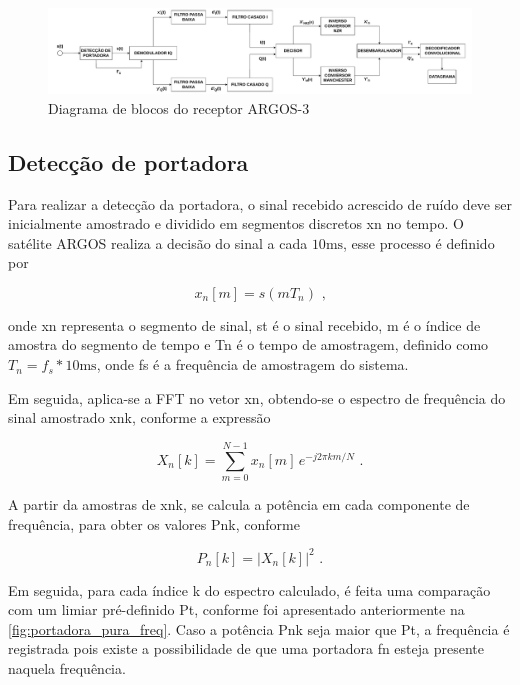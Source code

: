 \begin{figure}[H]
	\centering
	\caption{Diagrama de blocos do receptor ARGOS-3}\label{fig:diagrama_blocos_demodulador}
	\includegraphics[width=\linewidth]{assets/blocos_demodulador.pdf}
\end{figure}


\subsection{Detecção de portadora}

Para realizar a detecção da portadora, o sinal recebido acrescido de ruído deve ser inicialmente amostrado e dividido em segmentos discretos \gls{xn} no tempo. O satélite \gls{ARGOS} realiza a decisão do sinal a cada $10 \text{ms}$, esse processo é definido por 

\vspace{-0.4em}
\begin{equation}
    x_n[m] = s(mT_n) \text{ ,}
\end{equation}

\noindent onde \gls{xn} representa o segmento de sinal, \gls{st} é o sinal recebido, \gls{m} é o índice de amostra do segmento de tempo e \gls{Tn} é o tempo de amostragem, definido como $T_n = f_s * 10 \text{ms}$, onde \gls{fs} é a frequência de amostragem do sistema. 


Em seguida, aplica-se a \gls{FFT} no vetor \gls{xn}, obtendo-se o espectro de frequência do sinal amostrado \gls{xnk}, conforme a expressão 

\vspace{-0.4em}
\begin{equation}
    X_n[k] = \sum_{m=0}^{N-1} x_n[m]\, e^{-j2\pi km/N} \text{ .}
\end{equation}

A partir da amostras de \gls{xnk}, se calcula a potência em cada componente de frequência, para obter os valores \gls{Pnk}, conforme

\vspace{-0.4em}
\begin{equation}
    P_n[k] = |X_n[k]|^2 \text{ .}
\end{equation}

Em seguida, para cada índice \gls{k} do espectro calculado, é feita uma comparação com um limiar pré-definido \gls{Pt}, conforme foi apresentado anteriormente na \autoref{fig:portadora_pura_freq}. Caso a potência \gls{Pnk} seja maior que \gls{Pt}, a frequência é registrada pois existe a possibilidade de que uma portadora \gls{fn} esteja presente naquela frequência. 

